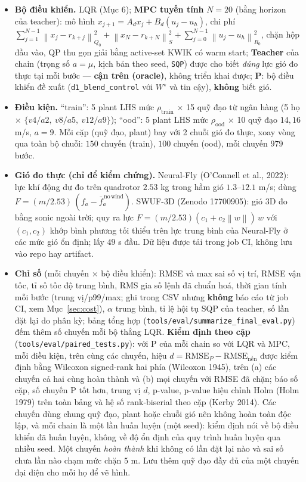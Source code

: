 \documentclass[11pt]{article}
\newcommand{\norm}[1]{\left\lVert #1 \right\rVert}
\begin{document}
\begin{itemize}[leftmargin=1.4em,itemsep=1pt]
\item \textbf{Bộ điều khiển.} LQR (Mục 6); \textbf{MPC tuyến tính}
$N=20$ (bằng horizon của teacher): mô hình $x_{j+1}=A_dx_j+B_d(u_j-u_h)$, chi phí $\sum_{j=1}^{N-1}\norm{x_j-r_{k+j}}_{Q_0}^2+\norm{x_N-r_{k+N}}_{S}^2
+\sum_{j=0}^{N-1}\norm{u_j-u_h}_{R_0}^2$, chặn hộp đầu vào, QP thu gọn giải bằng active-set KWIK có warm start;
\textbf{Teacher} của chain (trọng số $a=\mu$, kịch bản theo seed, \texttt{SQP})
được cho biết \emph{đúng} lực gió đo thực tại mỗi bước --- \textbf{cận trên (oracle)}, không triển khai được;
\textbf{P}: bộ điều khiển đề xuất (\texttt{d1\_blend\_control} với $W^\star$ và tin cậy), \textbf{không} biết gió.
\item \textbf{Điều kiện.} ``train'': 5 plant LHS mức $\rho_{\mathrm{train}}$ $\times$ 15 quỹ đạo từ ngân
hàng (5 họ $\times$ $\{v4/a2,\ v8/a5,\ v12/a9\}$); ``ood'': 5 plant LHS mức $\rho_{\mathrm{ood}}$ $\times$
10 quỹ đạo $14,16$ m/s, $a=9$. Mỗi cặp (quỹ đạo, plant) bay với 2 chuỗi gió đo thực, xoay vòng qua
toàn bộ chuỗi: $150$ chuyến (train), $100$ chuyến (ood), mỗi chuyến $979$ bước.
\item \textbf{Gió đo thực (chỉ để kiểm chứng).} Neural-Fly (O'Connell et al., 2022): lực khí động dư đo trên
quadrotor $2.53$ kg trong hầm gió $1.3$--$12.1$ m/s; dùng $F=(m/2.53)\,(f_a-\bar f_a^{\,\mathrm{no\,wind}})$.
SWUF-3D (Zenodo 17700905): gió 3D đo bằng sonic ngoài trời; quy ra lực
$F=(m/2.53)(c_1+c_2\norm{w})\,w$ với $(c_1,c_2)$ khớp bình phương tối thiểu trên lực trung bình của Neural-Fly
ở các mức gió ổn định; lấy $49$ s đầu. Dữ liệu được tải trong job CI, không lưu vào repo hay artifact.
\item \textbf{Chỉ số} (mỗi chuyến $\times$ bộ điều khiển): RMSE và max sai số vị trí, RMSE vận tốc, tỉ số tốc
độ trung bình, RMS gia số lệnh đã chuẩn hoá, thời gian tính mỗi bước (trung vị/p99/max; ghi trong CSV nhưng
\textbf{không} báo cáo từ job CI, xem Mục~\ref{sec:cost}), $\alpha$ trung bình, tỉ
lệ hội tụ SQP của teacher, số lần đặt lại do phân kỳ; bảng tổng hợp
(\texttt{tools/\allowbreak eval/\allowbreak summarize\_\allowbreak final\_\allowbreak eval.py}) đếm thêm số chuyến
mỗi bộ thắng LQR. \textbf{Kiểm định theo cặp} (\texttt{tools/\allowbreak eval/\allowbreak paired\_\allowbreak tests.py}):
với P của mỗi chain so với LQR và MPC, mỗi điều kiện, trên cùng các chuyến, hiệu $d=\mathrm{RMSE}_P-\mathrm{RMSE}_{\mathrm{nền}}$
được kiểm định bằng Wilcoxon signed-rank hai phía (Wilcoxon 1945), trên (a) các chuyến cả hai cùng hoàn thành và (b) mọi
chuyến với RMSE đã chặn; báo số cặp, số chuyến P tốt hơn, trung vị $d$, p-value, p-value hiệu chỉnh Holm (Holm 1979)
trên toàn bảng và hệ số rank-biserial theo cặp (Kerby 2014). Các chuyến dùng chung quỹ đạo, plant hoặc chuỗi gió nên
không hoàn toàn độc lập, và mỗi chain là một lần huấn luyện (một seed): kiểm định nói về bộ điều khiển đã huấn luyện,
không về độ ổn định của quy trình huấn luyện qua nhiều seed. Một chuyến
\emph{hoàn thành} khi không có lần đặt lại nào và sai số chưa lần nào chạm mức chặn $5$ m. Lưu thêm quỹ đạo đầy
đủ của một chuyến đại diện cho mỗi họ để vẽ hình.
\end{itemize}
\end{document}
